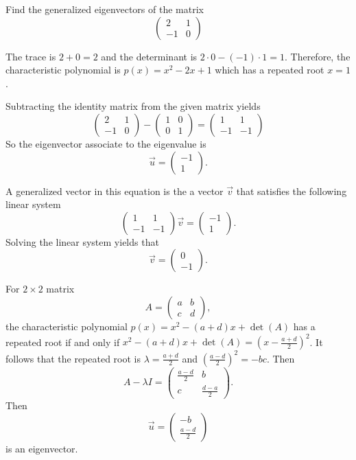 \begin{example}
  Find the generalized eigenvectors of the matrix
  \[\begin{pmatrix}
    2&1\\
    -1&0
  \end{pmatrix}\]
\end{example}
\begin{solution}
  The trace is $2+0=2$ and the determinant is $2\cdot 0-(-1)\cdot 1=1$. Therefore, the characteristic polynomial is $p(x)=x^2-2x+1$ which has a repeated root $x=1$.

  Subtracting the identity matrix from the given matrix yields
  \[\begin{pmatrix}
    2&1\\
    -1&0
  \end{pmatrix}
  -\begin{pmatrix}
    1 & 0\\
    0 & 1
  \end{pmatrix}=
  \begin{pmatrix}
    1 & 1 \\
    -1 & -1
  \end{pmatrix}
  \]
  So the eigenvector associate to the eigenvalue is
  \[
    \vec{u}=
  \begin{pmatrix}
    -1 \\ 1
  \end{pmatrix}.  
  \]

  A generalized vector in this equation is the a vector $\vec{v}$ that satisfies the following linear system
  \[
    \begin{pmatrix}
    1&1\\
    -1&-1
  \end{pmatrix}
  \vec{v}=\begin{pmatrix}
    -1 \\ 1
  \end{pmatrix}.
  \]
  Solving the linear system yields that
  \[
  \vec{v}=\begin{pmatrix}
    0\\ -1
  \end{pmatrix}.  
  \]
\end{solution}

For $2\times 2$ matrix
\[
A=\begin{pmatrix}
  a & b \\
  c & d
\end{pmatrix}, 
\]
the characteristic polynomial $p(x)=x^2-(a+d)x+\det(A)$ has a repeated root if and only if $x^2-(a+d)x+\det(A)=\left(x-\frac{a+d}{2}\right)^2$. It follows that the repeated root is $\lambda=\frac{a+d}{2}$ and $\left(\frac{a-d}{2}\right)^2=-bc$. Then
\[
A-\lambda I=
\begin{pmatrix}
  \frac{a-d}{2} & b\\
  c & \frac{d-a}{2}
\end{pmatrix}.  
\]
Then 
\[
  \vec{u}=
  \begin{pmatrix}
    -b \\ \frac{a-d}{2}
  \end{pmatrix}
\]
is an eigenvector.

